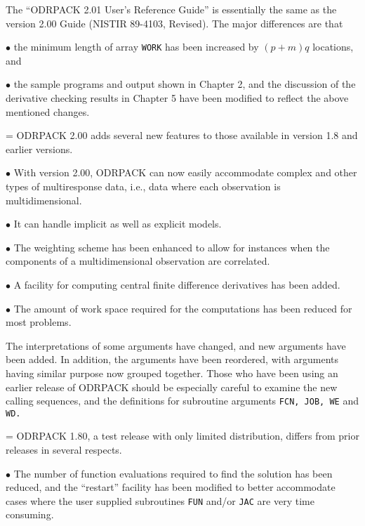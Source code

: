 \aligntobox The ``ODRPACK 2.01 User's Reference Guide'' is essentially the same as the version 2.00 Guide (NISTIR 89-4103, Revised). The major differences are that

\aligntobox $\bullet$ the minimum length of array {\tt WORK} has been increased by $(p + m)q$ locations, and

\aligntobox $\bullet$ the sample programs and output shown in Chapter 2, and the discussion of the derivative checking results in Chapter 5 have been modified to reflect the above mentioned changes.\medskip

\hangindent=\wd\mybox{} ODRPACK 2.00 adds several new features to those available in version 1.8 and earlier versions.

\aligntobox $\bullet$ With version 2.00, ODRPACK can now easily accommodate complex and other types of multiresponse data, i.e., data where each observation is multidimensional.

\aligntobox $\bullet$ It can handle implicit as well as explicit models.

\aligntobox $\bullet$ The weighting scheme has been enhanced to allow for instances when the components of a multidimensional observation are correlated.

\aligntobox $\bullet$ A facility for computing central finite difference derivatives has been added.

\aligntobox $\bullet$ The amount of work space required for the computations has been reduced for most problems.\medskip

 The interpretations of some arguments have changed, and new arguments have been added. In addition, the arguments have been reordered, with arguments having similar purpose now grouped together. Those who have been using an earlier release of ODRPACK should be especially careful to examine the new calling sequences, and the definitions for subroutine arguments {\tt FCN, JOB, WE} and {\tt WD.}\medskip

\hangindent=\wd\mybox{} ODRPACK 1.80, a test release with only limited distribution, differs from prior releases in several respects.

\aligntobox $\bullet$ The number of function evaluations required to find the solution has been reduced, and the ``restart'' facility has been modified to better accommodate cases where the user supplied subroutines {\tt FUN} and/or {\tt JAC} are very time consuming.

